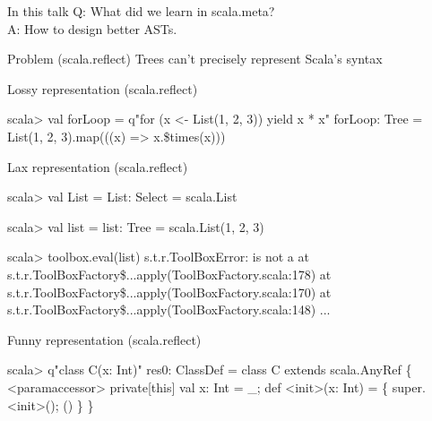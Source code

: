 \documentclass[svgnames,dvipsnames,hyperref={bookmarks=false},usepdftitle=false]{beamer}
\begin{document}
\begin{frame}{In this talk}
Q: What did we learn in scala.meta?\\
A: How to design better ASTs.
\end{frame}


\begin{frame}{Problem (scala.reflect)}
Trees can't precisely represent Scala's syntax
\end{frame}

\begin{frame}[fragile]{Lossy representation (scala.reflect)}
\begin{semiverbatim}
scala> val forLoop = q"for (x <- List(1, 2, 3)) yield x * x"
forLoop: Tree = List(1, 2, 3).\alert<2>{map}(\alert<3>{((x) => x.\$times(x))})

\end{semiverbatim}
\end{frame}

\begin{frame}[fragile]{Lax representation (scala.reflect)}
\begin{semiverbatim}
scala> val List = 
List: Select = scala.List

scala> val list = 
list: Tree = scala.List(1, 2, 3)

scala> toolbox.eval(list)
s.t.r.ToolBoxError:  is not a 
  at s.t.r.ToolBoxFactory\$...apply(ToolBoxFactory.scala:178)
  at s.t.r.ToolBoxFactory\$...apply(ToolBoxFactory.scala:170)
  at s.t.r.ToolBoxFactory\$...apply(ToolBoxFactory.scala:148)
  ...
\end{semiverbatim}
\end{frame}

\begin{frame}[fragile]{Funny representation (scala.reflect)}
\begin{semiverbatim}
scala> q"\alert<1>{class C(x: Int)}"
res0: ClassDef =
\alert<1>{class C} extends scala.AnyRef \{
  <paramaccessor> private[this] val x: Int = _;
  def <init>\alert<1>{(x: Int)} = \{
    super.<init>();
    ()
  \}
\}
\end{semiverbatim}
\end{frame}
\end{document}
